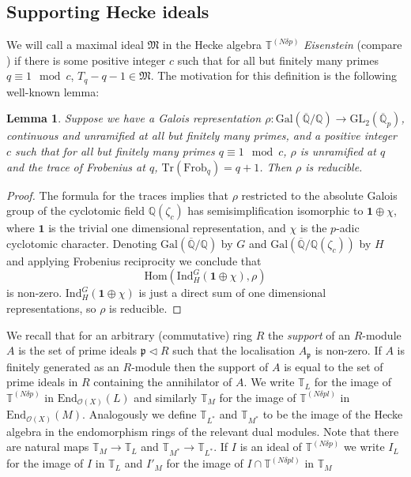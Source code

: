 \documentclass[a4paper, notitlepage]{amsart}
\newcommand{\Q}{\ensuremath{\mathbb{Q}}\xspace}
\newcommand{\OO}{\ensuremath{\mathscr{O}}\xspace}
\newtheorem{lemma}[theorem]{Lemma}
\begin{document}
\subsection{Supporting Hecke ideals}
We will call a maximal ideal $\mathfrak{M}$ in the Hecke algebra $\mathbb{T}^{(N \delta p)}$ \emph{Eisenstein} (compare \cite{M}) if there is some positive integer $c$ such that for all but finitely many primes $q\equiv 1 \mod c$, $T_q-q-1\in \mathfrak{M}$. The motivation for this definition is the following well-known lemma:

\begin{lemma}Suppose we have a Galois representation $\rho: \mathrm{Gal}(\overline{\Q}/\Q)\rightarrow \mathrm{GL}_2(\overline{\Q}_p)$, continuous and unramified at all but finitely many primes, and a positive integer $c$ such that for all but finitely many primes $q \equiv 1 \mod c$, $\rho$ is unramified at $q$ and the trace of Frobenius at $q$, $\mathrm{Tr}(\mathrm{Frob}_q)=q+1$. Then $\rho$ is reducible.
\end{lemma}
\begin{proof} The formula for the traces implies that $\rho$ restricted to the absolute Galois group of the cyclotomic field $\Q(\zeta_c)$ has semisimplification isomorphic to $\mathbf{1}\oplus \chi$, where $\mathbf{1}$ is the trivial one dimensional representation, and $\chi$ is the $p$-adic cyclotomic character. Denoting $\mathrm{Gal}(\overline{\Q}/\Q)$ by $G$ and $\mathrm{Gal}(\overline{\Q}/\Q(\zeta_c))$ by $H$  and applying Frobenius reciprocity we conclude that $$\mathrm{Hom}(\mathrm{Ind}_H^G(\mathbf{1}\oplus \chi),\rho)$$ is non-zero. $\mathrm{Ind}_H^G(\mathbf{1}\oplus \chi)$ is just a direct sum of one dimensional representations, so $\rho$ is reducible.
\end{proof}
We recall that for an arbitrary (commutative) ring $R$ the \emph{support} of an $R$-module $A$ is the set of prime ideals $\mathfrak{p}\lhd R$ such that the localisation $A_\mathfrak{p}$ is non-zero. If $A$ is finitely generated as an $R$-module then the support of $A$ is equal to the set of prime ideals in $R$ containing the annihilator of $A$. We write $\mathbb{T}_L$ for the image of $\mathbb{T}^{(N \delta p)}$ in $\mathrm{End}_{\OO(X)}(L)$ and similarly $\mathbb{T}_M$ for the image of $\mathbb{T}^{(N \delta p l)}$ in $\mathrm{End}_{\OO(X)}(M)$. Analogously we define $\mathbb{T}_{L^*}$ and $\mathbb{T}_{M^*}$ to be the image of the Hecke algebra in the endomorphism rings of the relevant dual modules. Note that there are natural maps $\mathbb{T}_M\rightarrow \mathbb{T}_L$ and $\mathbb{T}_{M^*}\rightarrow \mathbb{T}_{L^*}$. If $I$ is an ideal of $\mathbb{T}^{(N\delta p)}$ we write $I_L$ for the image of $I$ in $\mathbb{T}_L$ and $I'_M$ for the image of $I\cap \mathbb{T}^{(N\delta pl)}$ in $\mathbb{T}_M$
\end{document}
